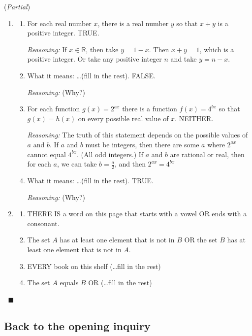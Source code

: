 \documentclass[11pt]{article}
\newcommand{\R}{\mathbb{R}}
\theoremstyle{definition}
\newenvironment{solution}{{\it Solution.} }{\hfill {\color{lightgray}$\blacksquare$}}
\begin{document}
\begin{solution}({\it Partial})
\begin{enumerate}
\item  \begin{enumerate}
	\item For each real number $x$, there is a real number $y$ so that $x+y$ is a positive integer.  TRUE.  
	
{\it Reasoning:} If $x\in \R$, then take $y=1-x$. Then $x+y=1$, which is a positive integer. Or take any positive integer $n$ and take $y=n-x$.

	\item  What it means: \dots (fill in the rest). FALSE.
	
	{\it Reasoning:}  (Why?)
	\item For each function $g(x)=2^{ax}$ there is a function $f(x)=4^{bx}$ so that $g(x)=h(x)$ on every possible real value of $x$. NEITHER. 
	
	{\it Reasoning:} The truth of this statement depends on the possible values of $a$ and $b$. If $a$ and $b$ must be integers, then there are some $a$ where $2^{ax}$ cannot equal $4^{bx}$. (All odd integers.) If $a$ and $b$ are rational or real, then for each $a$, we can take $b=\frac{a}{2}$, and then $2^{ax}=4^{bx}$
	\item What it means: \dots (fill in the rest). TRUE. 
	
	{\it Reasoning:}  (Why?)
	\end{enumerate}
\item 
	\begin{enumerate}
	\item THERE IS a word on this page that starts with a vowel OR ends with a consonant.
	\item The set $A$ has at least one element that is not in $B$ OR the set $B$ has at least one element that is not in $A$.
	\item EVERY book on this shelf (\dots fill in the rest)
	\item The set $A$ equals $B$ OR (\dots fill in the rest)
	\end{enumerate}
\end{enumerate}
\vspace*{-18pt}$\;$
\end{solution}

\subsection{Back to the opening inquiry}
\end{document}
